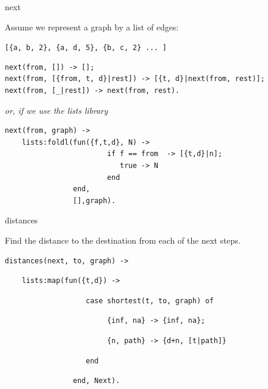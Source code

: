 \begin{frame}[fragile]{next}

  Assume we represent a graph by a list of edges:

  \vspace{10pt}\hspace{40pt}\texttt{[\{a, b, 2\}, \{a, d, 5\}, \{b, c, 2\} ... ]}  
  
\begin{verbatim}
next(from, []) -> [];
next(from, [{from, t, d}|rest]) -> [{t, d}|next(from, rest)];
next(from, [_|rest]) -> next(from, rest).
\end{verbatim}

\pause\vspace{10pt} 
{\em or, if we use the lists library}

\begin{verbatim}
next(from, graph) ->
    lists:foldl(fun({f,t,d}, N) -> 
                        if f == from  -> [{t,d}|n];
                           true -> N
                        end
                end,
                [],graph).
\end{verbatim}
\end{frame}

\begin{frame}[fragile]{distances}

  Find the distance to the destination from each of the next steps.

\vspace{20pt} \pause
  
\begin{verbatim}
distances(next, to, graph) ->
\end{verbatim}
\pause
\begin{verbatim}
    lists:map(fun({t,d}) ->   
\end{verbatim}
\pause
\begin{verbatim}
                   case shortest(t, to, graph) of 
\end{verbatim}
\pause
\begin{verbatim}
                        {inf, na} -> {inf, na};
\end{verbatim}
\pause
\begin{verbatim}
                        {n, path} -> {d+n, [t|path]}
\end{verbatim}
\pause
\begin{verbatim}
                   end
\end{verbatim}
\begin{verbatim}
                end, Next).    
\end{verbatim}
\end{frame}

